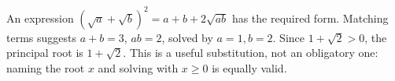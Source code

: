 An expression $(\sqrt a+\sqrt b)^2=a+b+2\sqrt{ab}$ has the required form. Matching terms suggests $ a+b=3 $, $ ab=2 $, solved by $ a=1,b=2 $. Since $ 1+\sqrt2>0 $, the principal root is $\boxed{1+\sqrt2}$. This is a useful substitution, not an obligatory one: naming the root $ x $ and solving with $ x\ge0 $ is equally valid.
